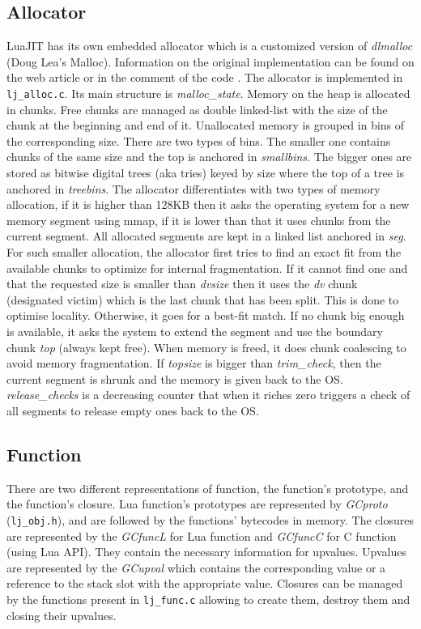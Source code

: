 \subsection{Allocator}
\label{Subsec:alloc}

LuaJIT has its own embedded allocator which is a customized version of \emph{dlmalloc} (Doug Lea's Malloc). Information on the original implementation can be found on the web article \cite{dlmalloc-art} or in the comment of the code \cite{dlmalloc-impl}. The allocator is implemented in \texttt{lj\_alloc.c}. Its main structure is \emph{malloc\_state}. Memory on the heap is allocated in chunks. Free chunks are managed as double linked-list with the size of the chunk at the beginning and end of it. Unallocated memory is grouped in bins of the corresponding size. There are two types of bins. The smaller one contains chunks of the same size and the top is anchored in \emph{smallbins}. The bigger ones are stored as bitwise digital trees (aka tries) keyed by size where the top of a tree is anchored in \emph{treebins}. The allocator differentiates with two types of memory allocation, if it is higher than 128KB then it asks the operating system for a new memory segment using mmap, if it is lower than that it uses chunks from the current segment. All allocated segments are kept in a linked list anchored in \emph{seg}. For such smaller allocation, the allocator first tries to find an exact fit from the available
chunks to optimize for internal fragmentation. If it cannot find one and that
the requested size is smaller than \emph{dvsize} then it uses the \emph{dv}
chunk (designated victim) which is the last chunk that has been split. This is done to optimise locality. Otherwise, it goes for a best-fit match. If no chunk
big enough is available, it asks the system to extend the segment and use the
boundary chunk \emph{top} (always kept free). When memory is freed, it does chunk
coalescing to avoid memory fragmentation. If \emph{topsize} is bigger than
\emph{trim\_check}, then the current segment is shrunk and the memory is given
back to the OS. \emph{release\_checks} is a decreasing counter that when it
riches zero triggers a check of all segments to release empty ones back to the OS.

\subsection{Function}
\label{Subsec:func}

There are two different representations of function, the function's prototype,
and the function's closure. Lua function's prototypes are represented by \emph{GCproto} (\texttt{lj\_obj.h}), and are followed by the functions' bytecodes in memory.
The closures are represented by the \textit{GCfuncL} for Lua function and \textit{GCfuncC} for
C function (using Lua API). They contain the necessary information for
upvalues. Upvalues are represented by the \emph{GCupval} which contains the corresponding value or a reference to the stack slot with the
appropriate value. Closures can be managed by the functions present in
\texttt{lj\_func.c} allowing to create them, destroy them and closing their
upvalues.

